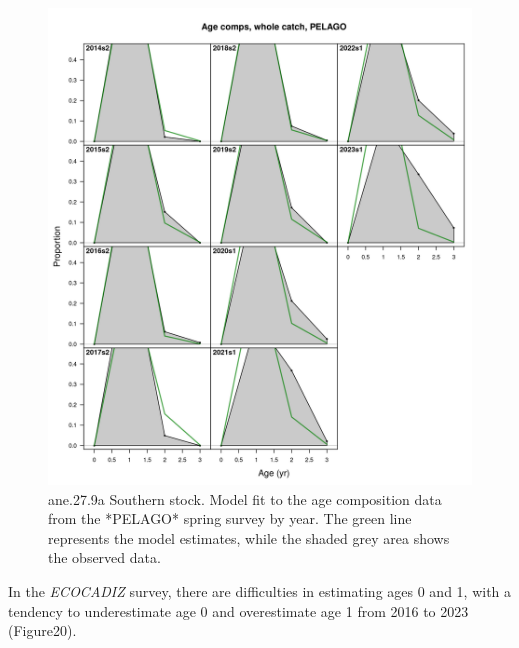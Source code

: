 \documentclass[
]{article}
\begin{document}
\begin{figure}[H]

{\centering \includegraphics[width=0.95\linewidth]{report/run/S1.0_4FLEETS_SelECO_RecIndex_Mnewfix/fig_age_fit_Pelago} 

}

\caption{ane.27.9a Southern stock. Model fit to the age composition data from the *PELAGO* spring survey by year. The green line represents the model estimates, while the shaded grey area shows the observed data.}\label{fig:unnamed-chunk-49}
\end{figure}

In the \emph{ECOCADIZ} survey, there are difficulties in estimating ages
0 and 1, with a tendency to underestimate age 0 and overestimate age 1
from 2016 to 2023 (Figure20).
\end{document}
